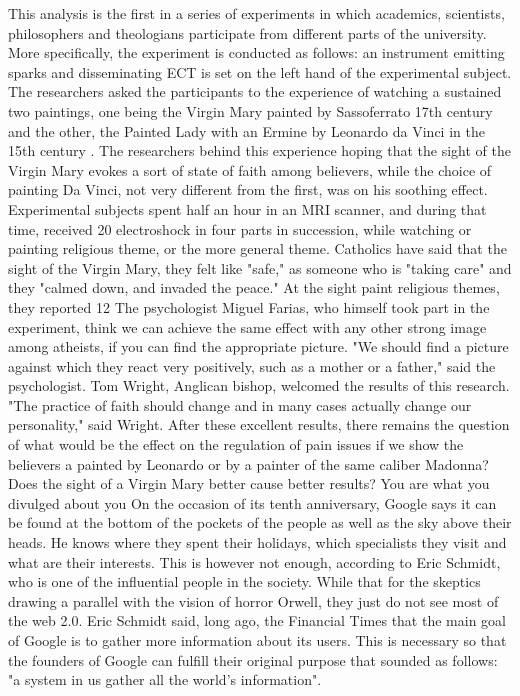 This analysis is the first in a series of experiments in which academics, scientists, philosophers and theologians participate from different parts of the university.
More specifically, the experiment is conducted as follows: an instrument emitting sparks and disseminating ECT is set on the left hand of the experimental subject.
The researchers asked the participants to the experience of watching a sustained two paintings, one being the Virgin Mary painted by Sassoferrato 17th century and the other, the Painted Lady with an Ermine by Leonardo da Vinci in the 15th century .
The researchers behind this experience hoping that the sight of the Virgin Mary evokes a sort of state of faith among believers, while the choice of painting Da Vinci, not very different from the first, was on his soothing effect.
Experimental subjects spent half an hour in an MRI scanner, and during that time, received 20 electroshock in four parts in succession, while watching or painting religious theme, or the more general theme.
Catholics have said that the sight of the Virgin Mary, they felt like "safe," as someone who is "taking care" and they "calmed down, and invaded the peace."
At the sight paint religious themes, they reported 12%
The psychologist Miguel Farias, who himself took part in the experiment, think we can achieve the same effect with any other strong image among atheists, if you can find the appropriate picture.
"We should find a picture against which they react very positively, such as a mother or a father," said the psychologist.
Tom Wright, Anglican bishop, welcomed the results of this research.
"The practice of faith should change and in many cases actually change our personality," said Wright.
After these excellent results, there remains the question of what would be the effect on the regulation of pain issues if we show the believers a painted by Leonardo or by a painter of the same caliber Madonna?
Does the sight of a Virgin Mary better cause better results?
You are what you divulged about you
On the occasion of its tenth anniversary, Google says it can be found at the bottom of the pockets of the people as well as the sky above their heads. He knows where they spent their holidays, which specialists they visit and what are their interests.
This is however not enough, according to Eric Schmidt, who is one of the influential people in the society.
While that for the skeptics drawing a parallel with the vision of horror Orwell, they just do not see most of the web 2.0.
Eric Schmidt said, long ago, the Financial Times that the main goal of Google is to gather more information about its users. This is necessary so that the founders of Google can fulfill their original purpose that sounded as follows: "a system in us gather all the world's information".
